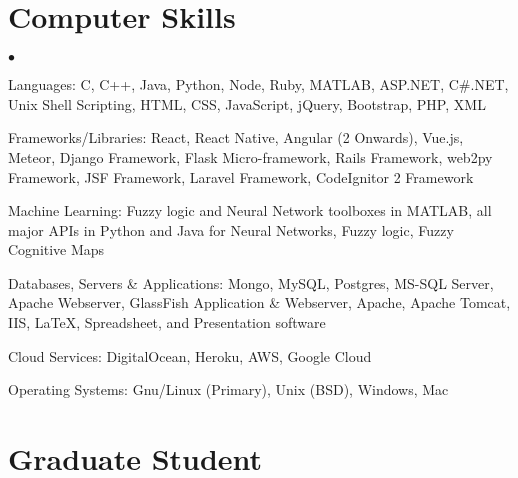 \documentclass[margin,line]{res}
\newenvironment{list2}{
  \begin{list}{$\bullet$}{%
      \setlength{\itemsep}{0in}
      \setlength{\parsep}{0in} \setlength{\parskip}{0in}
      \setlength{\topsep}{0in} \setlength{\partopsep}{0in}
      \setlength{\leftmargin}{0.2in}}}{\end{list}}
\begin{document}
\begin{resume}
\section{\sc Computer Skills}
\begin{list2}
\item Languages:  C, C++, Java, Python, Node, Ruby, MATLAB, ASP.NET, C\#.NET, Unix Shell Scripting, HTML, CSS, JavaScript, jQuery, Bootstrap, PHP, XML\\
\item Frameworks/Libraries: React, React Native, Angular (2 Onwards), Vue.js, Meteor, Django Framework, Flask Micro-framework, Rails Framework, web2py Framework, JSF Framework, Laravel Framework, CodeIgnitor 2 Framework
\item Machine Learning: Fuzzy logic and Neural Network toolboxes in MATLAB, all major APIs in Python and Java for Neural Networks, Fuzzy logic, Fuzzy Cognitive Maps  
\item Databases, Servers \& Applications: Mongo, MySQL, Postgres, MS-SQL Server, Apache Webserver, GlassFish Application \& Webserver, Apache, Apache Tomcat, IIS, \LaTeX, Spreadsheet, and Presentation software\\
\item Cloud Services: DigitalOcean, Heroku, AWS, Google Cloud
\item Operating Systems:  Gnu/Linux (Primary), Unix (BSD), Windows, Mac\\
\end{list2}

\newpage

\section{\sc Graduate Student}



\end{resume}
\end{document}

